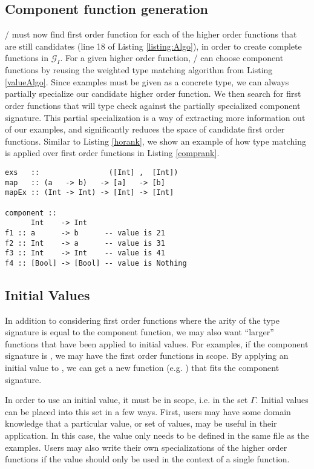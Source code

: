 \subsection{Component function generation}\label{makeFxns}

\ourTool/ must now find first order function for each of the higher order functions that are still candidates (line 18 of Listing \ref{listing:Algo}), in order to create complete functions in $\mathcal{G}_I$.
For a given higher order function, \ourTool/ can choose component functions by reusing the weighted type matching algorithm from Listing \ref{valueAlgo}.
Since examples must be given as a concrete type, we can always partially specialize our candidate higher order function. 
We then search for first order functions that will type check against the partially specialized component signature.
This partial specialization is a way of extracting more information out of our examples, and significantly reduces the space of candidate first order functions.
Similar to Listing \ref{horank}, we show an example of how type matching is applied over first order functions in Listing \ref{comprank}.

\begin{lstlisting}[caption=Ranking component function,label=comprank]
exs   ::                ([Int] ,  [Int])
map   :: (a   -> b)   -> [a]   -> [b]
mapEx :: (Int -> Int) -> [Int] -> [Int]

component ::
      Int    -> Int
f1 :: a      -> b      -- value is 21
f2 :: Int    -> a      -- value is 31
f3 :: Int    -> Int    -- value is 41
f4 :: [Bool] -> [Bool] -- value is Nothing
\end{lstlisting}

\subsection{Initial Values}\label{initVals}

In addition to considering first order functions where the arity of the type signature is equal to the component function, we may also want ``larger'' functions that have been applied to initial values.
For examples, if the component signature is , we may have the first order functions  in scope.
By applying an initial value to \codeinline{(+)}, we can get a new function (e.g. ) that fits the component signature.

In order to use an initial value, it must be in scope, i.e. in the set $\Gamma$.
Initial values can be placed into this set in a few ways.
First, users may have some domain knowledge that a particular value, or set of values, may be useful in their application.
In this case, the value only needs to be defined in the same file as the examples.
Users may also write their own specializations of the higher order functions if the value should only be used in the context of a single function.

